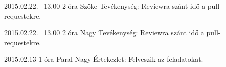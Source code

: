 \begin{naplo}
\bejegyzes
{2015.02.22. ~13.00}
{2 óra}
{Szőke} 
{Tevékenység: Reviewra szánt idő a pull-requestekre.\newline } 

\bejegyzes
{2015.02.22. ~13.00}
{2 óra}
{Nagy} 
{Tevékenység: Reviewra szánt idő a pull-requestekre.\newline } 

\bejegyzes
{2015.02.13}
{1 óra}
{Paral \newline Nagy} 
{Értekezlet: Felveszik az feladatokat.\newline } 


\end{naplo}

